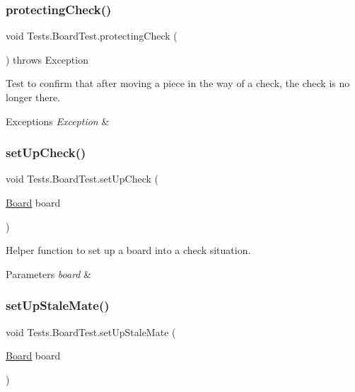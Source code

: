\subsubsection{\texorpdfstring{protecting\+Check()}{protectingCheck()}}
{\footnotesize\ttfamily void Tests.\+Board\+Test.\+protecting\+Check (\begin{DoxyParamCaption}{ }\end{DoxyParamCaption}) throws Exception}

Test to confirm that after moving a piece in the way of a check, the check is no longer there. 
\begin{DoxyExceptions}{Exceptions}
{\em Exception} & \\
\hline
\end{DoxyExceptions}
\hypertarget{class_tests_1_1_board_test_a33895f492ce1d7dfba81b325fa351da0}{}\label{class_tests_1_1_board_test_a33895f492ce1d7dfba81b325fa351da0} 
\subsubsection{\texorpdfstring{set\+Up\+Check()}{setUpCheck()}}
{\footnotesize\ttfamily void Tests.\+Board\+Test.\+set\+Up\+Check (\begin{DoxyParamCaption}\item[{\hyperlink{class_framework_1_1_board}{Board}}]{board }\end{DoxyParamCaption})}

Helper function to set up a board into a check situation. 
\begin{DoxyParams}{Parameters}
{\em board} & \\
\hline
\end{DoxyParams}
\hypertarget{class_tests_1_1_board_test_a6e66cbfe15e55e7f65f37a85fd8126b2}{}\label{class_tests_1_1_board_test_a6e66cbfe15e55e7f65f37a85fd8126b2} 
\subsubsection{\texorpdfstring{set\+Up\+Stale\+Mate()}{setUpStaleMate()}}
{\footnotesize\ttfamily void Tests.\+Board\+Test.\+set\+Up\+Stale\+Mate (\begin{DoxyParamCaption}\item[{\hyperlink{class_framework_1_1_board}{Board}}]{board }\end{DoxyParamCaption})}

